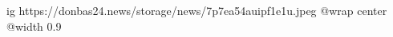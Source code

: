  
 
 
 
 

\ifcmt
  ig https://donbas24.news/storage/news/7p7ea54auipf1e1u.jpeg
  @wrap center
  @width 0.9
\fi

